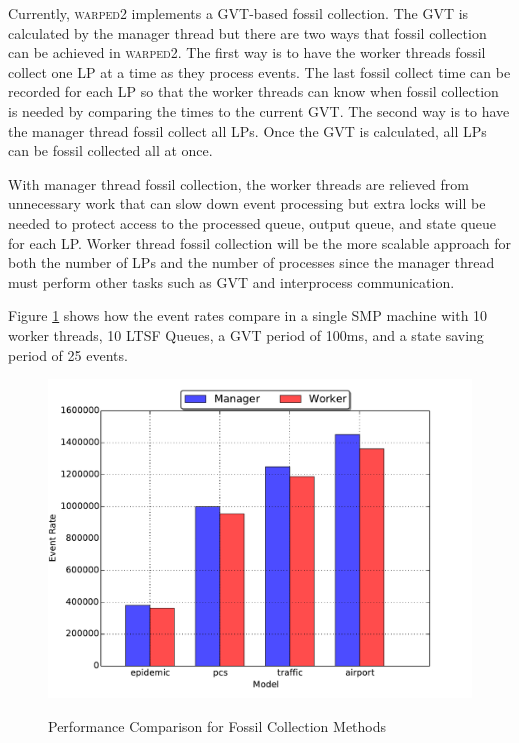 \documentclass[11pt]{book}
\begin{document}
Currently, \textsc{warped2} implements a GVT-based fossil collection. The GVT is calculated by
the manager thread but there are two ways that fossil collection can be achieved in \textsc{warped2}.
The first way is to have the worker threads fossil collect one LP at a time as they process events.
The last fossil collect time can be recorded for each LP so that the worker threads can know when fossil
collection is needed by comparing the times to the current GVT. The second way is to have the
manager thread fossil collect all LPs. Once the GVT is calculated, all LPs can be fossil collected
all at once.

With manager thread fossil collection, the worker threads are relieved from unnecessary work
that can slow down event processing but extra locks will be needed to protect access to the
processed queue, output queue, and state queue for each LP. Worker thread fossil collection
will be the more scalable approach for both the number of LPs and the number of processes since
the manager thread must perform other tasks such as GVT and interprocess communication.

Figure \ref{fc_times} shows how the event rates compare in a single SMP machine with
10 worker threads, 10 LTSF Queues, a GVT period of 100ms, and a state saving period of 25 events.

\begin{figure}
  \centering
  \includegraphics[width=\textwidth,quiet]{figs/fossil_collection/event_rates.pdf}\\
  \caption{Performance Comparison for Fossil Collection Methods}\label{fc_times}
\end{figure}
\end{document}
